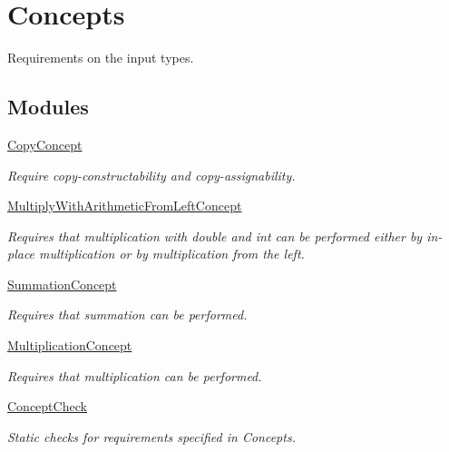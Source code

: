 \hypertarget{group__Concepts}{\section{Concepts}
\label{group__Concepts}
}


Requirements on the input types.  


\subsection*{Modules}
\begin{DoxyCompactItemize}
\item 
\hyperlink{group__CopyConcept}{Copy\-Concept}
\begin{DoxyCompactList}\small\item\em Require copy-\/constructability and copy-\/assignability. \end{DoxyCompactList}\item 
\hyperlink{group__MultiplyWithArithmeticFromLeftConcept}{Multiply\-With\-Arithmetic\-From\-Left\-Concept}
\begin{DoxyCompactList}\small\item\em Requires that multiplication with double and int can be performed either by in-\/place multiplication or by multiplication from the left. \end{DoxyCompactList}\item 
\hyperlink{group__SummationConcept}{Summation\-Concept}
\begin{DoxyCompactList}\small\item\em Requires that summation can be performed. \end{DoxyCompactList}\item 
\hyperlink{group__MultiplicationConcept}{Multiplication\-Concept}
\begin{DoxyCompactList}\small\item\em Requires that multiplication can be performed. \end{DoxyCompactList}\item 
\hyperlink{group__ConceptCheck}{Concept\-Check}
\begin{DoxyCompactList}\small\item\em Static checks for requirements specified in Concepts. \end{DoxyCompactList}\end{DoxyCompactItemize}
